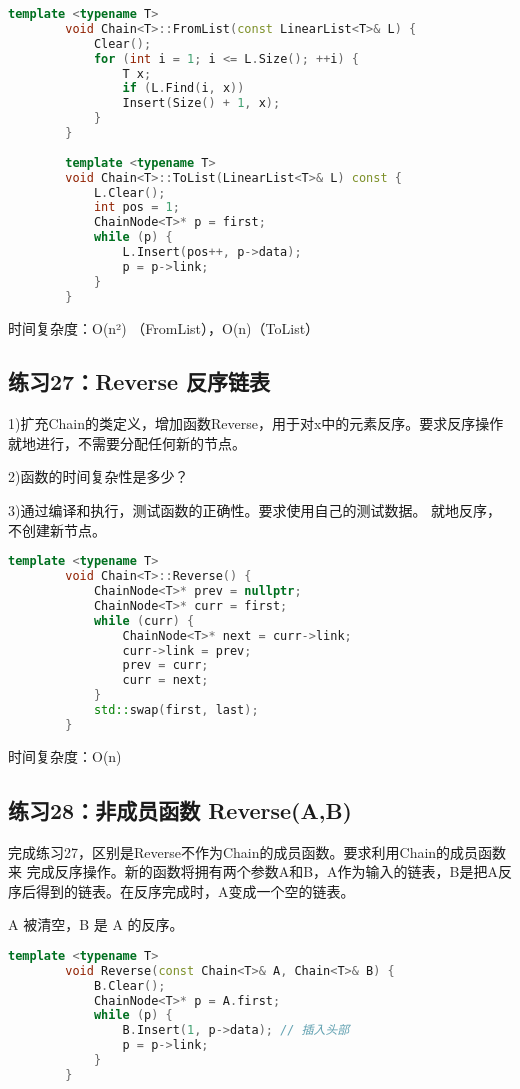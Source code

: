 \documentclass[UTF8]{ctexart}
\begin{document}
	\begin{lstlisting}[language=C++]
		template <typename T>
		void Chain<T>::FromList(const LinearList<T>& L) {
			Clear();
			for (int i = 1; i <= L.Size(); ++i) {
				T x;
				if (L.Find(i, x))
				Insert(Size() + 1, x);
			}
		}
		
		template <typename T>
		void Chain<T>::ToList(LinearList<T>& L) const {
			L.Clear();
			int pos = 1;
			ChainNode<T>* p = first;
			while (p) {
				L.Insert(pos++, p->data);
				p = p->link;
			}
		}
	\end{lstlisting}
	
	 时间复杂度：O(n²) （FromList），O(n)（ToList）
	
	
	
	\subsection*{练习27：Reverse 反序链表}
	1)扩充Chain的类定义，增加函数Reverse，用于对x中的元素反序。要求反序操作就地进行，不需要分配任何新的节点。
	
	2)函数的时间复杂性是多少？
	
	3)通过编译和执行，测试函数的正确性。要求使用自己的测试数据。
	就地反序，不创建新节点。
	
	\begin{lstlisting}[language=C++]
		template <typename T>
		void Chain<T>::Reverse() {
			ChainNode<T>* prev = nullptr;
			ChainNode<T>* curr = first;
			while (curr) {
				ChainNode<T>* next = curr->link;
				curr->link = prev;
				prev = curr;
				curr = next;
			}
			std::swap(first, last);
		}
	\end{lstlisting}
	
	 时间复杂度：O(n)
	
	
	
	\subsection*{练习28：非成员函数 Reverse(A,B)}
	完成练习27，区别是Reverse不作为Chain的成员函数。要求利用Chain的成员函数来
	完成反序操作。新的函数将拥有两个参数A和B，A作为输入的链表，B是把A反序后得到的链表。在反序完成时，A变成一个空的链表。
	
	A 被清空，B 是 A 的反序。
	
	\begin{lstlisting}[language=C++]
		template <typename T>
		void Reverse(const Chain<T>& A, Chain<T>& B) {
			B.Clear();
			ChainNode<T>* p = A.first;
			while (p) {
				B.Insert(1, p->data); // 插入头部
				p = p->link;
			}
		}
	\end{lstlisting}
	
\end{document}
